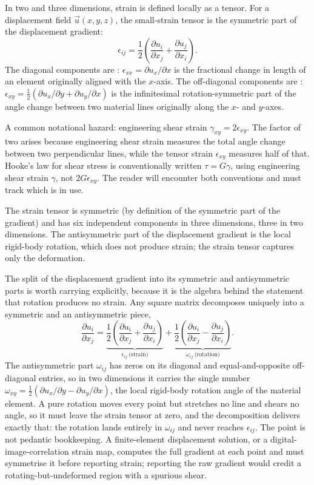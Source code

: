 In two and three dimensions, strain is defined locally as a tensor.
For a displacement field $\vec{u}(x, y, z)$, the small-strain tensor
is the symmetric part of the displacement gradient:
\[
\epsilon_{ij} = \frac{1}{2}\left(\frac{\partial u_i}{\partial x_j}
+ \frac{\partial u_j}{\partial x_i}\right).
\]
The diagonal components are : $\epsilon_{xx}
= \partial u_x / \partial x$ is the fractional change in length of an
element originally aligned with the $x$-axis. The off-diagonal
components are : $\epsilon_{xy} = \frac{1}{2}
(\partial u_x/\partial y + \partial u_y/\partial x)$ is the
infinitesimal rotation-symmetric part of the angle change between
two material lines originally along the $x$- and $y$-axes.

A common notational hazard: engineering shear strain $\gamma_{xy} = 2
\epsilon_{xy}$. The factor of two arises because engineering shear
strain measures the total angle change between two perpendicular
lines, while the tensor strain $\epsilon_{xy}$ measures half of
that. Hooke's law for shear stress is conventionally written $\tau =
G \gamma$, using engineering shear strain $\gamma$, not $2G
\epsilon_{xy}$. The reader will encounter both conventions and must
track which is in use.



The strain tensor is symmetric (by definition of the symmetric part
of the gradient) and has six independent components in three
dimensions, three in two dimensions. The antisymmetric part of the
displacement gradient is the local rigid-body rotation, which does
not produce strain; the strain tensor captures only the
deformation.

The split of the displacement gradient into its symmetric and
antisymmetric parts is worth carrying explicitly, because it is the
algebra behind the statement that rotation produces no strain. Any
square matrix decomposes uniquely into a symmetric and an antisymmetric
piece,
\[
\frac{\partial u_i}{\partial x_j} = \underbrace{\frac{1}{2}\left(
\frac{\partial u_i}{\partial x_j} + \frac{\partial u_j}{\partial x_i}
\right)}_{\epsilon_{ij}\ \text{(strain)}} + \underbrace{\frac{1}{2}
\left(\frac{\partial u_i}{\partial x_j} - \frac{\partial u_j}{\partial
x_i}\right)}_{\omega_{ij}\ \text{(rotation)}}.
\]
The antisymmetric part $\omega_{ij}$ has zeros on its diagonal and
equal-and-opposite off-diagonal entries, so in two dimensions it carries
the single number $\omega_{xy} = \tfrac{1}{2}(\partial u_x/\partial y -
\partial u_y/\partial x)$, the local rigid-body rotation angle of the
material element. A pure rotation moves every point but stretches no
line and shears no angle, so it must leave the strain tensor at zero,
and the decomposition delivers exactly that: the rotation lands entirely
in $\omega_{ij}$ and never reaches $\epsilon_{ij}$. The point is not
pedantic bookkeeping. A finite-element displacement solution, or a
digital-image-correlation strain map, computes the full gradient at each
point and must symmetrise it before reporting strain; reporting the raw
gradient would credit a rotating-but-undeformed region with a spurious
shear.

